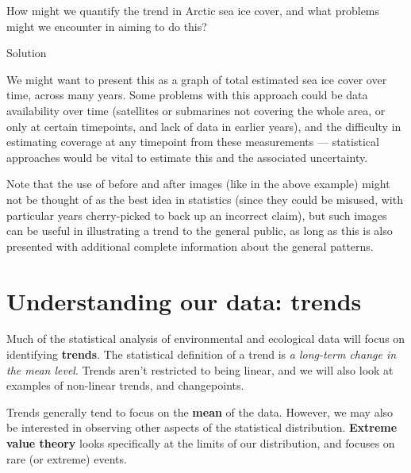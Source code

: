 \documentclass[
  letterpaper,
  DIV=11,
  numbers=noendperiod]{scrartcl}
\begin{document}
\begin{tcolorbox}[enhanced jigsaw, coltitle=black, colframe=quarto-callout-tip-color-frame, bottomrule=.15mm, leftrule=.75mm, toptitle=1mm, titlerule=0mm, title={Exercise 5}, bottomtitle=1mm, toprule=.15mm, rightrule=.15mm, arc=.35mm, opacityback=0, opacitybacktitle=0.6, left=2mm, colbacktitle=quarto-callout-tip-color!10!white, breakable, colback=white]

How might we quantify the trend in Arctic sea ice cover, and what
problems might we encounter in aiming to do this?

Solution

We might want to present this as a graph of total estimated sea ice
cover over time, across many years. Some problems with this approach
could be data availability over time (satellites or submarines not
covering the whole area, or only at certain timepoints, and lack of data
in earlier years), and the difficulty in estimating coverage at any
timepoint from these measurements --- statistical approaches would be
vital to estimate this and the associated uncertainty.

Note that the use of before and after images (like in the above example)
might not be thought of as the best idea in statistics (since they could
be misused, with particular years cherry-picked to back up an incorrect
claim), but such images can be useful in illustrating a trend to the
general public, as long as this is also presented with additional
complete information about the general patterns.

\end{tcolorbox}

\section{Understanding our data:
trends}\label{understanding-our-data-trends}

Much of the statistical analysis of environmental and ecological data
will focus on identifying \textbf{trends}. The statistical definition of
a trend is \emph{a long-term change in the mean level}. Trends aren't
restricted to being linear, and we will also look at examples of
non-linear trends, and changepoints.

Trends generally tend to focus on the \textbf{mean} of the data.
However, we may also be interested in observing other aspects of the
statistical distribution. \textbf{Extreme value theory} looks
specifically at the limits of our distribution, and focuses on rare (or
extreme) events.
\end{document}
